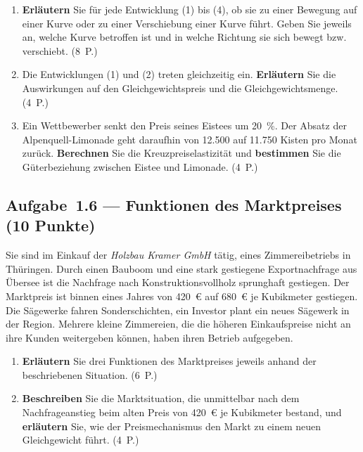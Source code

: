 \begin{enumerate}[label=\alph*)]
  \item \textbf{Erläutern} Sie für jede Entwicklung (1) bis (4), ob sie zu einer Bewegung
    auf einer Kurve oder zu einer Verschiebung einer Kurve führt. Geben Sie jeweils an,
    welche Kurve betroffen ist und in welche Richtung sie sich bewegt bzw. verschiebt.
    \hfill (8~P.)
  \item Die Entwicklungen (1) und (2) treten gleichzeitig ein. \textbf{Erläutern} Sie die
    Auswirkungen auf den Gleichgewichtspreis und die Gleichgewichtsmenge. \hfill (4~P.)
  \item Ein Wettbewerber senkt den Preis seines Eistees um 20~\%. Der Absatz der
    Alpenquell-Limonade geht daraufhin von 12.500 auf 11.750 Kisten pro Monat zurück.
    \textbf{Berechnen} Sie die Kreuzpreiselastizität und \textbf{bestimmen} Sie die
    Güterbeziehung zwischen Eistee und Limonade. \hfill (4~P.)
\end{enumerate}

\subsection*{Aufgabe~1.6 --- Funktionen des Marktpreises (10 Punkte)}

Sie sind im Einkauf der \emph{Holzbau Kramer GmbH} tätig, eines Zimmereibetriebs in
Thüringen. Durch einen Bauboom und eine stark gestiegene Exportnachfrage aus Übersee ist
die Nachfrage nach Konstruktionsvollholz sprunghaft gestiegen. Der Marktpreis ist binnen
eines Jahres von 420~€ auf 680~€ je Kubikmeter gestiegen. Die Sägewerke fahren
Sonderschichten, ein Investor plant ein neues Sägewerk in der Region. Mehrere kleine
Zimmereien, die die höheren Einkaufspreise nicht an ihre Kunden weitergeben können,
haben ihren Betrieb aufgegeben.

\begin{enumerate}[label=\alph*)]
  \item \textbf{Erläutern} Sie drei Funktionen des Marktpreises jeweils anhand der
    beschriebenen Situation. \hfill (6~P.)
  \item \textbf{Beschreiben} Sie die Marktsituation, die unmittelbar nach dem
    Nachfrageanstieg beim alten Preis von 420~€ je Kubikmeter bestand, und
    \textbf{erläutern} Sie, wie der Preismechanismus den Markt zu einem neuen
    Gleichgewicht führt. \hfill (4~P.)
\end{enumerate}

